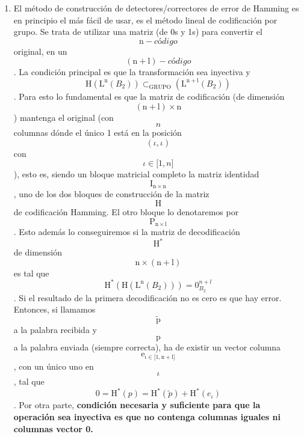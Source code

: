 \documentclass[
]{article}
\begin{document}
\begin{enumerate}
\begin{enumerate}
\begin{enumerate}
\begin{enumerate}
        Luego la corrección será
        \[\mathtt{\mathrm{\widetilde{p}}}\rightarrow\mathtt{\mathrm{p^{i}}}\]necesariamente.
        Siempre habrá una sola pala\-bra de nuestro código que esté a
        distancia menor o igual que \[p\], estando las de\-más palabras
        del código a distancia mayor o igual que \[p + 1\].
      \item
        El método de construcción de detectores/correctores de error de
        Hamming es en principio el más fácil de usar, es el método
        lineal de codificación por grupo. Se trata de utilizar una
        matriz (de 0s y 1s) para convertir el
        \[\mathtt{\mathrm{n}} - \mathit{código}\] original, en
        un\[\left( \mathtt{\mathrm{n + l}} \right) - \mathit{código}\].
        La condición principal es que la transformación sea inyecti\-va
        y\[\mathtt{\mathrm{H}}\left( {\mathtt{\mathrm{L}}^{\mathtt{\mathrm{n}}}\left( B_{2} \right)} \right) \subset_{\text{GRUPO}}\left( {\mathtt{\mathrm{L}}^{\mathtt{\mathrm{n + l}}}\left( B_{2} \right)} \right)\].
        Para esto lo fundamental es que la matriz de codificación (de
        dimensión
        \[\left( \mathtt{\mathrm{n + l}} \right) \times \mathtt{\mathrm{n}}\])
        mantenga el original (con \[n\] colum\-nas dónde el único 1 está
        en la posición
        \[\left( {\iota,\iota} \right)\]con\[\iota \in {\lbrack{1,n}\rbrack}\]),
        esto es, siendo un bloque matricial completo la matriz
        identidad\[\mathtt{\mathrm{I_{n \times n}}}\], uno de los dos
        bloques de construcción de la matriz\[\mathtt{\mathrm{H}}\]de
        codificación Hamming. El otro bloque lo de\-notaremos por
        \[\mathtt{\mathrm{P_{n \times l}}}\]. Esto además lo
        conseguiremos si la matriz de decodifica\-ción
        \[\mathtt{\mathrm{H}}^{\mathbf{\mathrm{\ast}}}\]de dimensión
        \[\mathtt{\mathrm{n \times \left( {n + l} \right)}}\]es tal que
        \[\mathtt{\mathrm{H^{\mathbf{\mathrm{\ast}}}}}{\left( {\mathtt{\mathrm{H}}\left( {\mathtt{\mathrm{L}}^{\mathtt{\mathrm{n}}}\left( B_{2} \right)} \right)} \right) = 0_{B_{2}}^{n + l}}\].
        Si el resultado de la primera decodificación no es cero es que
        hay error. Entonces, si llamamos
        \[\widetilde{\mathtt{\mathrm{p}}}\]a la palabra recibida y
        \[\mathtt{\mathrm{p}}\]a la palabra enviada (siempre correcta),
        ha de existir un vector columna
        \[\mathtt{\mathrm{e_{\iota \in {\lbrack{1,{n + l}}\rbrack}}}}\],
        con un único uno en \[\iota\], tal que
        \[{0 = \mathtt{\mathrm{H^{\mathbf{\mathrm{\text{*}}}}}}}{(p) = \mathtt{\mathrm{H^{\mathbf{\mathrm{\text{*}}}}}}}{\left( \widetilde{p} \right) + {\mathtt{\mathrm{H^{\mathbf{\mathrm{\text{*}}}}}}\left( e_{\iota} \right)}}\].
        Por otra parte, \textbf{condición necesaria y sufi\-ciente para
        que la operación sea inyectiva es que no contenga columnas
        igua\-les ni columnas vector 0.}


\end{enumerate}
\end{enumerate}
\end{enumerate}
\end{enumerate}
\end{document}
